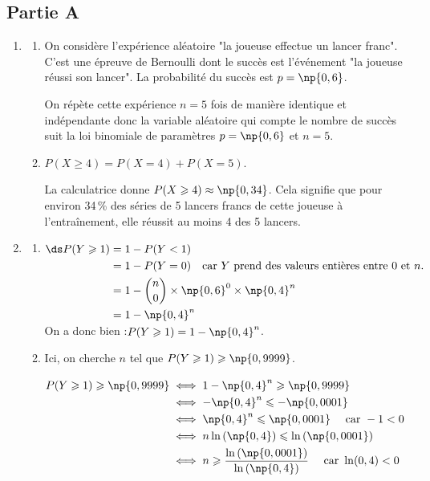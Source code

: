 	\subsection*{Partie A}

	\medskip

	\begin{enumerate}
		\item \begin{enumerate}
			\item On considère l'expérience aléatoire "la joueuse effectue un lancer franc". C'est une épreuve de Bernoulli dont le succès est l'événement "la joueuse réussi son lancer". La probabilité du succès est $p=\np{0,6}$.

			On répète cette expérience $n=5$ fois de manière identique et indépendante donc la variable aléatoire qui compte le nombre de succès suit la loi binomiale de paramètres $p=\np{0,6}$ et $n=5$.

			\item $P(X \geqslant 4)=P(X=4) + P(X=5)$.

			La calculatrice donne $P(X \geqslant 4) \approx \np{0,34}$. Cela signifie que pour environ 34\,\% des séries de 5 lancers francs de cette joueuse à l'entraînement, elle réussit au moins 4 des 5 lancers.
		\end{enumerate}

		\item \begin{enumerate}
			\item $\ds \aligned[t] P(Y \geqslant 1) &=1 - P(Y < 1) \\
				& =1 - P(Y=0)\quad \text{car $Y$ prend des valeurs entières entre 0 et $n$.}\\
				& = 1 - \binom{n}{0} \times \np{0,6}^0 \times \np{0,4}^n\\
				& =1 - \np{0,4}^n
			\endaligned$
			On a donc bien :\quad $P(Y \geqslant 1)  =1 - \np{0,4}^n$.

			\item Ici, on cherche $n$ tel que $P(Y \geqslant 1) \geqslant \np{0,9999}$.

			$\aligned[t] P(Y \geqslant 1) \geqslant \np{0,9999} &\iff 1- \np{0,4}^n \geqslant \np{0,9999}\\
			& \iff -\np{0,4}^n \leqslant -\np{0,0001}\\
			& \iff \np{0,4}^n \leqslant \np{0,0001}\quad \text{ car } -1 < 0\\
			& \iff n \ln\left( \np{0,4} \right) \leqslant \ln \left( \np{0,0001} \right)\\
			& \iff n \geqslant \frac{\ln \left( \np{0,0001} \right)}{\ln\left( \np{0,4} \right)} \quad \text{ car } \ln(0,4) < 0
			\endaligned$


\end{enumerate}
\end{enumerate}
